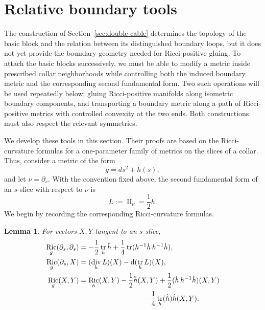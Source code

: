 \documentclass[11pt,reqno]{amsart}
\newtheorem{lemma}[theorem]{Lemma}
\theoremstyle{definition}
\numberwithin{equation}{section}
\DeclareMathOperator{\Ric}{Ric}
\DeclareMathOperator{\II}{II}
\DeclareMathOperator{\tr}{tr}
\DeclareMathOperator{\divsymb}{div}
\newcommand{\dd}{\mathop{}\!\mathrm d}
\begin{document}
\section{Relative boundary tools}
\label{sec:relative-tools}
The construction of Section~\ref{sec:double-cable} determines the topology of
the basic block and the relation between its distinguished boundary
loops, but
it does not yet provide the boundary geometry needed for Ricci-positive
gluing.  To attach the basic blocks successively, we must be able to
modify a metric inside prescribed collar neighborhoods while controlling
both the induced boundary metric and the corresponding second
fundamental form.  Two such operations will be used repeatedly below:
gluing Ricci-positive manifolds along isometric boundary components, and
transporting a boundary metric along a path of Ricci-positive metrics
with controlled convexity at the two ends.  Both constructions must also
respect the relevant symmetries.

We develop these tools in this section.  Their proofs are based on the
Ricci-curvature formulas for a one-parameter family of metrics on the
slices of a collar.  Thus, consider a metric of the form
\[
g=ds^2+h(s),
\]
and let \(\nu=\partial_s\).  With the convention fixed above, the second
fundamental form of an \(s\)-slice with respect to \(\nu\) is
\[
L:=\II_{\nu}=\frac12\dot h.
\]
We begin by recording the corresponding Ricci-curvature formulas.


\begin{lemma}\label{lem:gaussian-ricci-unified}
For vectors $X,Y$ tangent to an $s$-slice,
\begin{align}
 \Ric_g(\partial_s,\partial_s)
 &=-\frac12\tr_h\ddot h
   +\frac14\tr(h^{-1}\dot h\,h^{-1}\dot h),\label{eq:gaussian-normal}\\
 \Ric_g(\partial_s,X)
 &=(\divsymb_hL)(X)-\dd(\tr_hL)(X),\label{eq:gaussian-mixed}\\
 \Ric_g(X,Y)
 &=\Ric_h(X,Y)-\frac12\ddot h(X,Y)
   +\frac12(\dot h\,h^{-1}\dot h)(X,Y)\notag\\
 &\hspace{31mm}
   -\frac14\tr_h(\dot h)\dot h(X,Y).\label{eq:gaussian-tangential}
\end{align}
\end{lemma}
\end{document}
